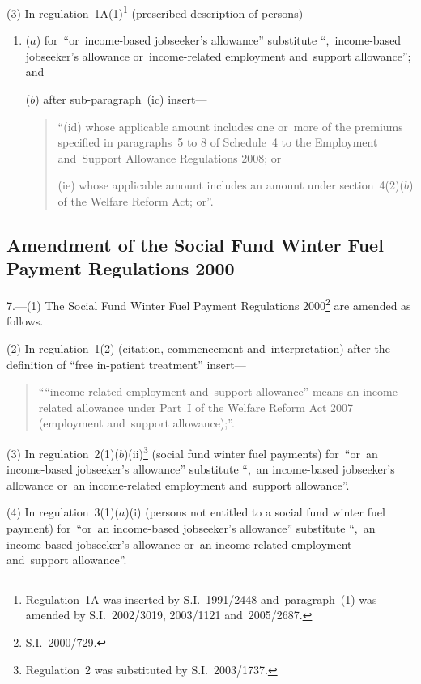 \documentclass[12pt,a4paper]{article}
\begin{document}
(3) In regulation~1A(1)\footnote{Regulation~1A was inserted by S.I.~1991/2448 and~paragraph~(1) was amended by S.I.~2002/3019, 2003/1121 and~2005/2687.} (prescribed description of persons)—
\begin{enumerate}\item[]
($a$) for~“or~income-based jobseeker’s allowance” substitute “,~income-based jobseeker’s allowance or~income-related employment and~support allowance”; and

($b$) after sub-paragraph~(ic) insert—
\begin{quotation}
“(id) whose applicable amount includes one or~more of the premiums specified in paragraphs~5 to 8 of Schedule~4 to the Employment and~Support Allowance Regulations 2008; or

(ie) whose applicable amount includes an amount under section~4(2)($b$)  of the Welfare Reform Act; or”.
\end{quotation}
\end{enumerate}

\subsection[7. Amendment of the Social Fund Winter Fuel Payment Regulations 2000]{Amendment of the Social Fund Winter Fuel Payment Regulations 2000}

7.---(1)  The Social Fund Winter Fuel Payment Regulations 2000\footnote{S.I.~2000/729.} are amended as follows.

(2) In regulation~1(2) (citation, commencement and~interpretation) after the definition of “free in-patient treatment” insert—
\begin{quotation}
““income-related employment and~support allowance” means an income-related allowance under Part~I of the Welfare Reform Act 2007 (employment and~support allowance);”.
\end{quotation}

(3) In regulation~2(1)($b$)(ii)\footnote{Regulation~2 was substituted by S.I.~2003/1737.} (social fund winter fuel payments) for~“or~an income-based jobseeker’s allowance” substitute “,~an income-based jobseeker’s allowance or~an income-related employment and~support allowance”.

(4) In regulation~3(1)($a$)(i)  (persons not entitled to a social fund winter fuel payment) for~“or~an income-based jobseeker’s allowance” substitute “,~an income-based jobseeker’s allowance or~an income-related employment and~support allowance”.
\end{document}
